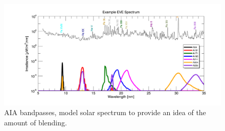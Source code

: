 \begin{figure}[!h]
    \begin{center}
	    \includegraphics[width=166mm]{Images/AiaBandpasses.png}
    \end{center}
    \caption[AIA bandpasses]{
	    AIA bandpasses, model solar spectrum to provide an idea of the amount of blending. 
	}
    \label{aiabandpasses}
\end{figure}